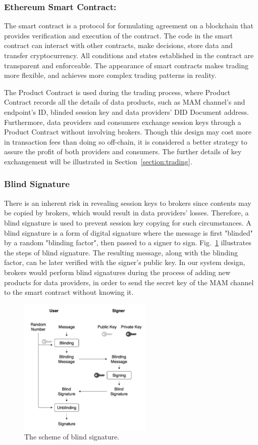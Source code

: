 \documentclass[conference]{IEEEtran}
\begin{document}
\subsubsection{Ethereum Smart Contract: }
The smart contract is a protocol for formulating agreement on a blockchain that provides verification and execution of the contract. The code in the smart contract can interact with other contracts, make decisions, store data and transfer cryptocurrency. All conditions and states established in the contract are transparent and enforceable. The appearance of smart contracts makes trading more flexible, and achieves more complex trading patterns in reality.

The Product Contract is used during the trading process, where Product Contract records all the details of data products, such as MAM channel's and endpoint's ID, blinded session key and data providers' DID Document address. Furthermore, data providers and consumers exchange session keys through a Product Contract without involving brokers. Though this design may cost more in transaction fees than doing so off-chain, it is considered a better strategy to assure the profit of both providers and consumers. The further details of key exchangement will be illustrated in Section~\ref{section:trading}.

\subsubsection{Blind Signature}
There is an inherent risk in revealing session keys to brokers since contents may be copied by brokers, which would result in data providers' losses. Therefore, a blind signature is used to prevent session key copying for such circumstances. A blind signature\cite{blindSig} is a form of digital signature where the message is first "blinded" by a random "blinding factor", then passed to a signer to sign. Fig.~\ref{fig:blind_signature} illustrates the steps of blind signature. The resulting message, along with the blinding factor, can be later verified with the signer's public key. In our system design, brokers would perform blind signatures during the process of adding new products for data providers, in order to send the secret key of the MAM channel to the smart contract without knowing it.

\begin{figure}[!t]
	\centering
	\includegraphics[width=2.5in]{blind_signature}
	\caption{The scheme of blind signature.}
	\label{fig:blind_signature}
\end{figure}
\end{document}
